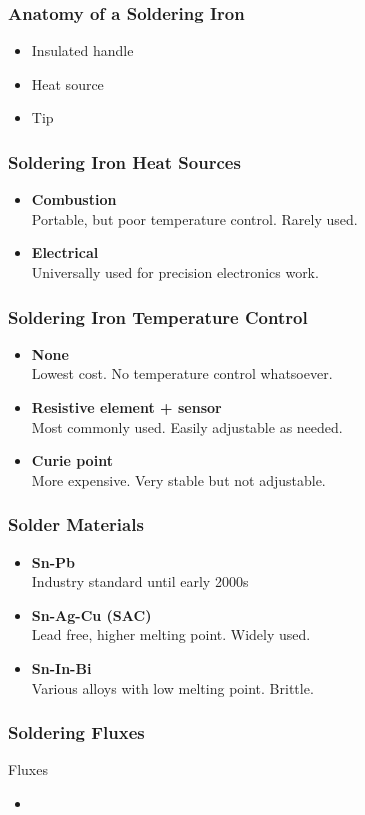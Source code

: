 \documentclass{beamer}
\begin{document}
\begin{frame}
\frametitle{Anatomy of a Soldering Iron}
\begin{itemize}
\item Insulated handle
\item Heat source
\item Tip
\end{itemize}
\end{frame}

\begin{frame}
\frametitle{Soldering Iron Heat Sources}
\begin{itemize}
\item \textbf{Combustion} \\
Portable, but poor temperature control. Rarely used.
\item \textbf{Electrical} \\
Universally used for precision electronics work.
\end{itemize}
\end{frame}

\begin{frame}
\frametitle{Soldering Iron Temperature Control}
\begin{itemize}
\item \textbf{None} \\
Lowest cost. No temperature control whatsoever.
\item \textbf{Resistive element + sensor} \\
Most commonly used. Easily adjustable as needed.
\item \textbf{Curie point} \\
More expensive. Very stable but not adjustable.
\end{itemize}
\end{frame}

\begin{frame}
\frametitle{Solder Materials}
\begin{itemize}
\item \textbf{Sn-Pb} \\
Industry standard until early 2000s
\item \textbf{Sn-Ag-Cu (SAC)} \\
Lead free, higher melting point. Widely used.
\item \textbf{Sn-In-Bi} \\
Various alloys with low melting point. Brittle.
\end{itemize}
\end{frame}

\begin{frame}
\frametitle{Soldering Fluxes}
Fluxes
\begin{itemize}
\item
\end{itemize}
\end{frame}
\end{document}
